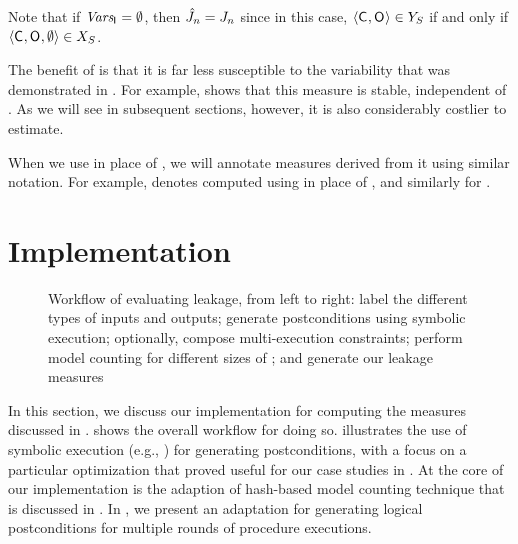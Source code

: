 Note that if $\mathit{Vars_{\mathsf{I}_{}}}=\emptyset$, then
$\hat{J}_{n}=J_{n}$ since in
this case, $\langle \mathsf{C}_{}, \mathsf{O}_{} \rangle \in
Y_{S_{}}$ if and only if $\langle \mathsf{C}_{},
\mathsf{O}_{}, \emptyset \rangle \in X_{S_{}}$.

The benefit of \JaccardRand{\secretsSetSize} is that it is far less
susceptible to the variability that was demonstrated in
.  For example,
 shows that this measure is stable,
independent of \modulus.  As we will see in subsequent sections,
however, it is also considerably costlier to estimate.

When we use \JaccardRand{\secretsSetSize} in place of
\Jaccard{\secretsSetSize}, we will annotate measures derived from it
using similar notation.  For example, \secretsSetSizeMinRand{} denotes
\secretsSetSizeMin{} computed using \JaccardRand{\secretsSetSize} in
place of \Jaccard{\secretsSetSize}, and similarly for
\secretsSetSizeMaxRand{}.


\section{Implementation}
\label{sscf:sec:impl}
\begin{figure*}
{
\centering
\resizebox{1.0\textwidth}{!}{\large}
}
\vspace{-0.1in}
\caption[Workflow of evaluating leakage]{Workflow of evaluating leakage, from left to right: label the
  different types of inputs and outputs; generate postconditions
  \postcondition{\proc}{} using symbolic execution; optionally,
  compose multi-execution constraints; perform model counting for
  different sizes of \secretsSetSize{}; and generate our leakage
  measures}
\label{fig:workflow}
\end{figure*}

In this section, we discuss our implementation for computing the
measures discussed in .  shows
the overall workflow for doing so.  illustrates
the use of symbolic execution (e.g.,
\cite{cadar08:klee,chipounov11:s2e}) for generating postconditions,
with a focus on a particular optimization that proved useful for our
case studies in .  At the core of our
implementation is the adaption of hash-based model counting
technique that is discussed in
.  In
, we present an adaptation for generating
logical postconditions for multiple rounds of procedure executions.

